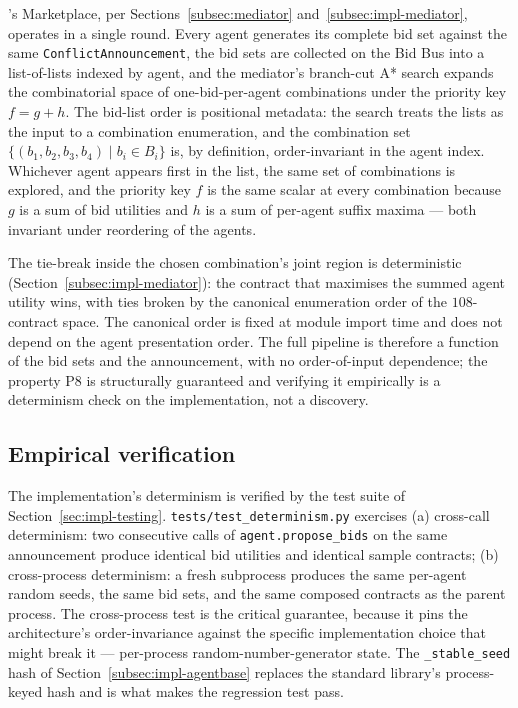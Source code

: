\NEXUS{}'s Marketplace, per Sections~\ref{subsec:mediator}
and~\ref{subsec:impl-mediator}, operates in a single round. Every
agent generates its complete bid set against the same
\texttt{ConflictAnnouncement}, the bid sets are collected on the
Bid Bus into a list-of-lists indexed by agent, and the mediator's
branch-cut A* search expands the combinatorial space of one-bid-per-agent
combinations under the priority key $f = g + h$. The bid-list order
is positional metadata: the search treats the lists as the input
to a combination enumeration, and the combination set
$\{(b_1, b_2, b_3, b_4) \mid b_i \in B_i\}$ is, by
definition, order-invariant in the agent index. Whichever agent
appears first in the list, the same set of combinations is
explored, and the priority key $f$ is the same scalar at every
combination because $g$ is a sum of bid utilities and $h$ is a sum
of per-agent suffix maxima --- both invariant under reordering of
the agents.

The tie-break inside the chosen combination's joint region is
deterministic (Section~\ref{subsec:impl-mediator}): the contract
that maximises the summed agent utility wins, with ties broken by
the canonical enumeration order of the $108$-contract space. The
canonical order is fixed at module import time and does not depend
on the agent presentation order. The full pipeline is therefore a
function of the bid sets and the announcement, with no order-of-input
dependence; the property P8 is structurally guaranteed and
verifying it empirically is a determinism check on the implementation,
not a discovery.

\subsection*{Empirical verification}

The implementation's determinism is verified by the test suite of
Section~\ref{sec:impl-testing}. \texttt{tests/test\_determinism.py}
exercises (a) cross-call determinism: two consecutive calls of
\texttt{agent.propose\_bids} on the same announcement produce
identical bid utilities and identical sample contracts; (b)
cross-process determinism: a fresh subprocess produces the same
per-agent random seeds, the same bid sets, and the same composed
contracts as the parent process. The cross-process test is the
critical guarantee, because it pins the architecture's
order-invariance against the specific implementation choice that
might break it --- per-process random-number-generator state. The
\texttt{\_stable\_seed} hash of
Section~\ref{subsec:impl-agentbase} replaces the standard library's
process-keyed hash and is what makes the regression test pass.

